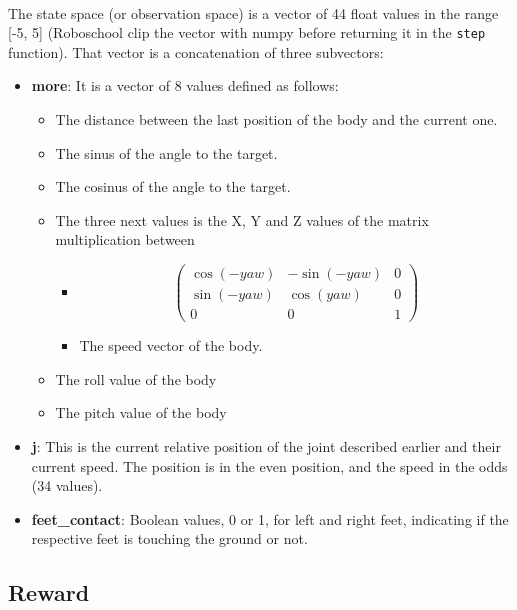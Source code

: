 \documentclass{article}
\begin{document}
\paragraph{}
The state space (or observation space) is a vector of 44 float values in the
range [-5, 5] (Roboschool clip the vector with numpy before returning it in the
\verb?step? function). That vector is a concatenation of three subvectors:
\begin{itemize}
    \item{\textbf{more}: It is a vector of 8 values defined as follows:
        \begin{itemize}
            \item{The distance between the last position of the body and the current one.}
            \item{The sinus of the angle to the target.}
            \item{The cosinus of the angle to the target.}
            \item{The three next values is the X, Y and Z values of the matrix multiplication between
                \begin{itemize}
                   \item{\[\left(
 \begin{matrix}
  \cos(-yaw) & -\sin(-yaw) & 0 \\
  \sin(-yaw) & \cos(yaw) & 0 \\
  0 & 0 & 1
 \end{matrix}\right)
\]}
                   \item{The speed vector of the body.}
                \end{itemize}}
            \item{The roll value of the body}
            \item{The pitch value of the body}
        \end{itemize}}
     \item{\textbf{j}: This is the current relative position of the joint described earlier and their current speed. The position is in the even position, and the speed in the odds (34 values).}
     \item{\textbf{feet\_contact}: Boolean values, 0 or 1, for left and right feet, indicating if the respective feet is touching the ground or not.}
\end{itemize}

\subsection{Reward}
\end{document}
